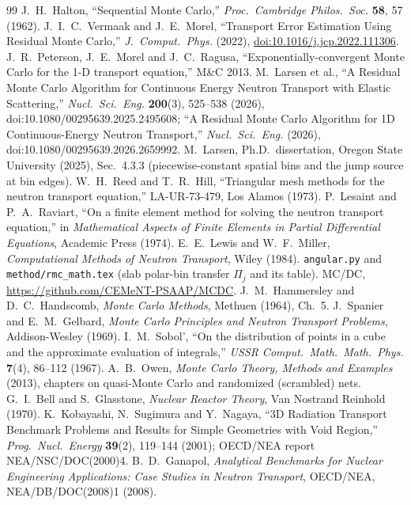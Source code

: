 \documentclass[11pt]{article}
\begin{document}
\begin{thebibliography}{99}
 J.~H.~Halton, ``Sequential Monte Carlo,'' \emph{Proc.\ Cambridge
  Philos.\ Soc.} \textbf{58}, 57 (1962).
 J.~I.~C.~Vermaak and J.~E.~Morel, ``Transport Error Estimation Using
  Residual Monte Carlo,'' \emph{J.\ Comput.\ Phys.} (2022),
  \href{https://doi.org/10.1016/j.jcp.2022.111306}{doi:10.1016/j.jcp.2022.111306}.
 J.~R.~Peterson, J.~E.~Morel and J.~C.~Ragusa,
  ``Exponentially-convergent Monte Carlo for the 1-D transport equation,'' M\&C 2013.
 M.~Larsen et al., ``A Residual Monte Carlo Algorithm for Continuous
  Energy Neutron Transport with Elastic Scattering,'' \emph{Nucl.\ Sci.\ Eng.}
  \textbf{200}(3), 525--538 (2026), doi:10.1080/00295639.2025.2495608;
  ``A Residual Monte Carlo Algorithm for 1D Continuous-Energy Neutron Transport,''
  \emph{Nucl.\ Sci.\ Eng.} (2026), doi:10.1080/00295639.2026.2659992.
 M.~Larsen, Ph.D.\ dissertation, Oregon State University (2025),
  Sec.~4.3.3 (piecewise-constant spatial bins and the jump source at bin edges).
 W.~H.~Reed and T.~R.~Hill, ``Triangular mesh methods for the neutron
  transport equation,'' LA-UR-73-479, Los Alamos (1973).
 P.~Lesaint and P.~A.~Raviart, ``On a finite element method for
  solving the neutron transport equation,'' in \emph{Mathematical Aspects of Finite
  Elements in Partial Differential Equations}, Academic Press (1974).
 E.~E.~Lewis and W.~F.~Miller, \emph{Computational Methods of Neutron
  Transport}, Wiley (1984).
 \texttt{angular.py} and \texttt{method/rmc\_math.tex} (slab polar-bin
  transfer $\Pi_j$ and its table).
 MC/DC, \url{https://github.com/CEMeNT-PSAAP/MCDC}.
 J.~M.~Hammersley and D.~C.~Handscomb, \emph{Monte Carlo
  Methods}, Methuen (1964), Ch.~5.
 J.~Spanier and E.~M.~Gelbard, \emph{Monte Carlo Principles and
  Neutron Transport Problems}, Addison-Wesley (1969).
 I.~M.~Sobol', ``On the distribution of points in a cube and the
  approximate evaluation of integrals,'' \emph{USSR Comput.\ Math.\ Math.\ Phys.}
  \textbf{7}(4), 86--112 (1967).
 A.~B.~Owen, \emph{Monte Carlo Theory, Methods and Examples} (2013),
  chapters on quasi-Monte Carlo and randomized (scrambled) nets.
 G.~I.~Bell and S.~Glasstone, \emph{Nuclear Reactor Theory}, Van
  Nostrand Reinhold (1970).
 K.~Kobayashi, N.~Sugimura and Y.~Nagaya, ``3D Radiation Transport
  Benchmark Problems and Results for Simple Geometries with Void Region,''
  \emph{Prog.\ Nucl.\ Energy} \textbf{39}(2), 119--144 (2001); OECD/NEA report
  NEA/NSC/DOC(2000)4.
 B.~D.~Ganapol, \emph{Analytical Benchmarks for Nuclear Engineering
  Applications: Case Studies in Neutron Transport}, OECD/NEA, NEA/DB/DOC(2008)1
  (2008).
\end{thebibliography}
\end{document}

